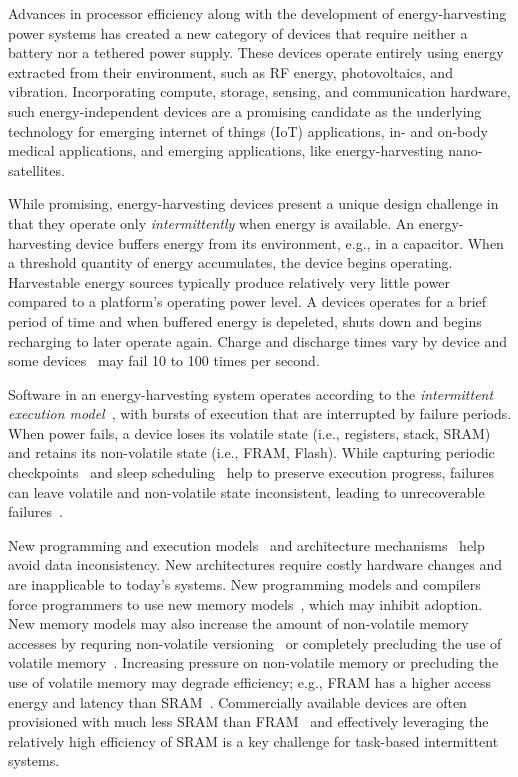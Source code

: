 Advances in processor efficiency along with the development of
energy-harvesting power systems has created a new category of devices that
require neither a battery nor a tethered power supply.  These devices operate
entirely using energy extracted from their environment, such as RF energy,
photovoltaics, and vibration.  Incorporating compute, storage, sensing, and
communication hardware, such energy-independent devices are a promising
candidate as the underlying technology for emerging internet of things (IoT)
applications, in- and on-body medical applications, and emerging applications,
like energy-harvesting nano-satellites.  

While promising, energy-harvesting devices present a unique design challenge in
that they operate only {\em intermittently} when energy is available.   An
energy-harvesting device buffers energy from its environment, e.g., in a
capacitor. When a threshold quantity of energy accumulates, the device begins
operating.  Harvestable energy sources typically produce relatively very little
power compared to a platform's operating power level.  A devices operates for a
brief period of time and when buffered energy is depeleted, shuts down and
begins recharging to later operate again.  Charge and discharge times vary by
device and some devices~\cite{wisp} may fail 10 to 100 times per second.

Software in an energy-harvesting system operates according to the {\em
intermittent execution model}~\cite{dino}, with bursts of execution that are
interrupted by failure periods. When power fails, a device loses its volatile
state (i.e., registers, stack, SRAM) and retains its non-volatile state (i.e.,
FRAM, Flash). While capturing periodic checkpoints~\cite{mementos,tictpl,quickrecall}
and sleep scheduling~\cite{dewdrop,hibernus,hibernusplusplus} help to preserve
execution progress, failures can leave volatile and non-volatile state inconsistent,
leading to unrecoverable failures~\cite{mspcdino,edb,edbtoppicks}.  


New programming and execution models~\cite{dino,ratchet,chain,alpaca} and
architecture mechanisms~\cite{clank, idetic, nvp} help avoid data
inconsistency.  New architectures require costly hardware changes and are
inapplicable to today's systems.  New programming models and compilers force
programmers to use new memory models~\cite{chain,ratchet}, which may inhibit
adoption.  New memory models may also increase the amount of non-volatile
memory accesses by requring non-volatile versioning~\cite{chain} or completely
precluding the use of volatile memory~\cite{ratchet}.  Increasing pressure on
non-volatile memory or precluding the use of volatile memory may degrade
efficiency; e.g., FRAM has a higher access energy and latency than
SRAM~\cite{alpaca,wisp}.  Commercially available devices are often provisioned
with much less SRAM than FRAM~\cite{wolverine,wisp} and effectively leveraging
the relatively high efficiency of SRAM is a key challenge for task-based
intermittent systems.


